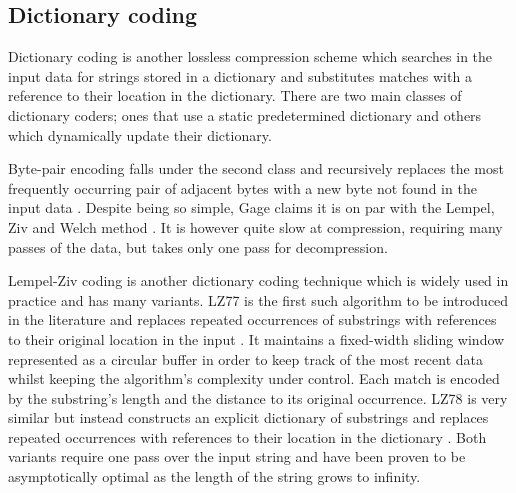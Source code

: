 
\subsection{Dictionary coding}

Dictionary coding is another lossless compression scheme which searches in the input data for strings stored in a dictionary and substitutes matches with a reference to their location in the dictionary. There are two main classes of dictionary coders; ones that use a static predetermined dictionary and others which dynamically update their dictionary.

Byte-pair encoding falls under the second class and recursively replaces the most frequently occurring pair of adjacent bytes with a new byte not found in the input data \cite{byte-pair}. Despite being so simple, Gage claims it is on par with the Lempel, Ziv and Welch method \cite{lzw}. It is however quite slow at compression, requiring many passes of the data, but takes only one pass for decompression.

Lempel-Ziv coding is another dictionary coding technique which is widely used in practice and has many variants. LZ77 is the first such algorithm to be introduced in the literature and replaces repeated occurrences of substrings with references to their original location in the input \cite{lz77}. It maintains a fixed-width sliding window represented as a circular buffer in order to keep track of the most recent data whilst keeping the algorithm's complexity under control. Each match is encoded by the substring's length and the distance to its original occurrence. LZ78 is very similar but instead constructs an explicit dictionary of substrings and replaces repeated occurrences with references to their location in the dictionary \cite{lz78}. Both variants require one pass over the input string and have been proven to be asymptotically optimal as the length of the string grows to infinity.

